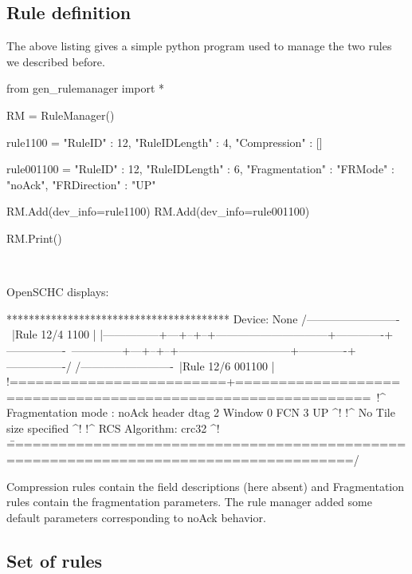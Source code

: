 \subsection{Rule definition}

The above listing gives a simple python program used to manage the two rules we described before. 


\begin{termc}[backgroundcolor=\color{gray!10}, basicstyle=\ttfamily\small, escapechar=@, language=Python]
from gen_rulemanager import *

RM = RuleManager()

rule1100 =   {
  "RuleID" : 12,
  "RuleIDLength" : 4,
  "Compression" : []
}

rule001100 =   {
  "RuleID" : 12,
  "RuleIDLength" : 6,
  "Fragmentation" :  {
    "FRMode" : "noAck",
    "FRDirection" : "UP"
  }
}

RM.Add(dev_info=rule1100)
RM.Add(dev_info=rule001100)

RM.Print()
\end{termc}

~~


OpenSCHC displays:

\begin{termc}[backgroundcolor=\color{gray!10}, basicstyle=\ttfamily\tiny, escapechar=@]
****************************************
Device: None
/-------------------------\
|Rule 12/4          1100  |
|---------------+---+--+--+------------------------------+-------------+----------------\
\---------------+---+--+--+------------------------------+-------------+----------------/
/-------------------------\
|Rule 12/6        001100  |
!=========================+=============================================================\
!^ Fragmentation mode : noAck    header dtag 2 Window  0 FCN  3                     UP ^!
!^ No Tile size specified                                                              ^!
!^ RCS Algorithm: crc32                                                                ^!
\=======================================================================================/
\end{termc}

Compression rules contain the field descriptions (here absent) and Fragmentation rules contain the fragmentation parameters. The rule manager added some default parameters corresponding to noAck behavior.



\subsection{Set of rules}

